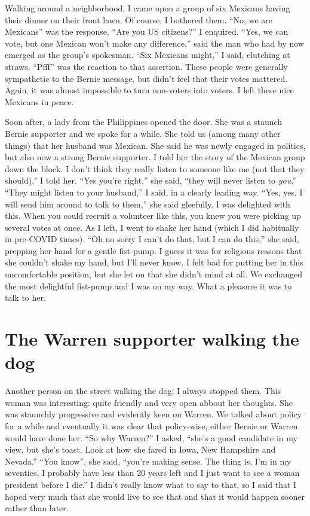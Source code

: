 \documentclass[]{book}
\begin{document}
Walking around a neighborhood, I came upon a group of six Mexicans having their dinner on their front lawn. Of course, I bothered them. ``No, we are Mexicans'' was the response. ``Are you US citizens?'' I enquired. ``Yes, we can vote, but one Mexican won't make any difference,'' said the man who had by now emerged as the group's spokesman. ``Six Mexicans might,'' I said, clutching at straws. ``Pfff'' was the reaction to that assertion. These people were generally sympathetic to the Bernie message, but didn't feel that their votes mattered. Again, it was almost impossible to turn non-voters into voters. I left these nice Mexicans in peace.

Soon after, a lady from the Philippines opened the door. She was a staunch Bernie supporter and we spoke for a while. She told us (among many other things) that her husband was Mexican. She said he was newly engaged in politics, but also now a strong Bernie supporter. I told her the story of the Mexican group down the block. I don't think they really listen to someone like me (not that they should)," I told her. ``Yes you're right,'' she said, ``they will never listen to \emph{you}.'' ``They might listen to your husband,'' I said, in a clearly leading way. ``Yes, yes, I will send him around to talk to them,'' she said gleefully. I was delighted with this. When you could recruit a volunteer like this, you knew you were picking up several votes at once. As I left, I went to shake her hand (which I did habitually in pre-COVID times). ``Oh no sorry I can't do that, but I can do this,'' she said, prepping her hand for a gentle fist-pump. I guess it was for religious reasons that she couldn't shake my hand, but I'll never know. I felt bad for putting her in this uncomfortable position, but she let on that she didn't mind at all. We exchanged the most delightful fist-pump and I was on my way. What a pleasure it was to talk to her.

\hypertarget{the-warren-supporter-walking-the-dog}{%
\section{The Warren supporter walking the dog}\label{the-warren-supporter-walking-the-dog}}

Another person on the street walking the dog; I always stopped them. This woman was interesting: quite friendly and very open abbout her thoughts. She was staunchly progressive and evidently keen on Warren. We talked about policy for a while and eventually it was clear that policy-wise, either Bernie or Warren would have done her. ``So why Warren?'' I asked, ``she's a good candidate in my view, but she's toast. Look at how she fared in Iowa, New Hampshire and Nevada.'' ``You know'', she said, ``you're making sense. The thing is, I'm in my seventies, I probably have less than 20 years left and I just want to see a woman president before I die.'' I didn't really know what to say to that, so I said that I hoped very much that she would live to see that and that it would happen sooner rather than later.
\end{document}
